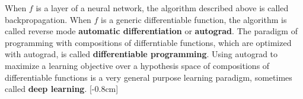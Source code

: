 When $f$ is a layer of a neural network, the algorithm described above is called backpropagation. When $f$ is a generic differentiable function, the algorithm is called reverse mode {\bf automatic differentiation} or {\bf autograd}. The paradigm of programming with compositions of differntiable functions, which are optimized with autograd, is called {\bf differentiable programming}. Using autograd to maximize a learning objective over a hypothesis space of compositions of differentiable functions is a very general purpose learning paradigm, sometimes called {\bf deep learning}.
[-0.8cm]